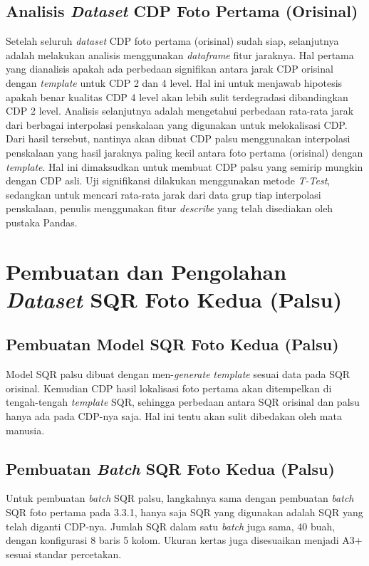 \subsection{Analisis \emph{Dataset} CDP Foto Pertama (Orisinal)}
Setelah seluruh \emph{dataset} CDP foto pertama (orisinal) sudah siap, selanjutnya adalah melakukan analisis menggunakan \emph{dataframe} fitur jaraknya. Hal pertama yang dianalisis apakah ada perbedaan signifikan antara jarak CDP orisinal dengan \emph{template} untuk CDP 2 dan 4 level. Hal ini untuk menjawab hipotesis apakah benar kualitas CDP 4 level akan lebih sulit terdegradasi dibandingkan CDP 2 level. Analisis selanjutnya adalah mengetahui perbedaan rata-rata jarak dari berbagai interpolasi penskalaan yang digunakan untuk melokalisasi CDP. Dari hasil tersebut, nantinya akan dibuat CDP palsu menggunakan interpolasi penskalaan yang hasil jaraknya paling kecil antara foto pertama (orisinal) dengan \emph{template}. Hal ini dimaksudkan untuk membuat CDP palsu yang semirip mungkin dengan CDP asli. Uji signifikansi dilakukan menggunakan metode \emph{T-Test}, sedangkan untuk mencari rata-rata jarak dari data grup tiap interpolasi penskalaan, penulis menggunakan fitur \emph{describe} yang telah disediakan oleh pustaka Pandas.

\section{Pembuatan dan Pengolahan \emph{Dataset} SQR Foto Kedua (Palsu)}
\subsection{Pembuatan Model SQR Foto Kedua (Palsu)}
Model SQR palsu dibuat dengan men-\emph{generate} \emph{template} sesuai data pada SQR orisinal. Kemudian CDP hasil lokalisasi foto pertama akan ditempelkan di
tengah-tengah \emph{template} SQR, sehingga perbedaan antara SQR orisinal dan palsu hanya ada pada CDP-nya saja. Hal ini tentu akan sulit dibedakan oleh mata
manusia.

\subsection{Pembuatan \emph{Batch} SQR Foto Kedua (Palsu)} Untuk pembuatan \emph{batch} SQR palsu, langkahnya sama dengan pembuatan \emph{batch} SQR foto pertama pada 3.3.1, hanya saja SQR yang
digunakan adalah SQR yang telah diganti CDP-nya. Jumlah SQR dalam satu \emph{batch} juga sama, 40 buah, dengan konfigurasi 8 baris 5 kolom. Ukuran kertas juga
disesuaikan menjadi A3+ sesuai standar percetakan.

